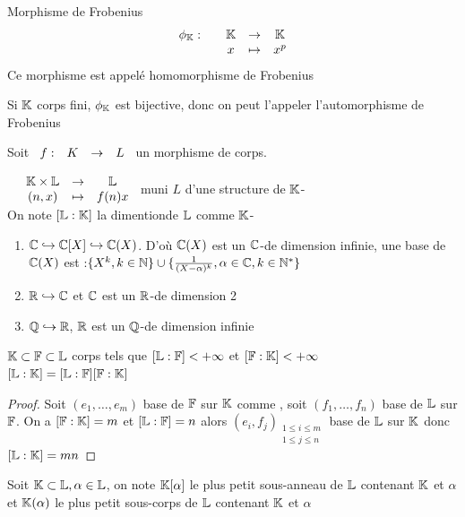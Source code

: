 \documentclass[]{report}
\begin{document}
    \begin{df}{Morphisme de Frobenius}{}
        \[\begin{array}{ccccc} \phi_{\mathbb{K}} : & & \mathbb{K} & \to & \mathbb{K} \\ & & x & \mapsto & x^p \end{array}\]
        Ce morphisme est appelé homomorphisme de Frobenius
    \end{df}

    \begin{re}{}{}
        Si $\mathbb{K}$ corps fini, $\phi_{\mathbb{K}}$ est bijective, donc on peut l'appeler l'automorphisme de Frobenius
    \end{re}

    Soit $\begin{array}{ccccc} f : & K & \to & L \end{array}$ un morphisme de corps.

    \begin{df}{}{}
        $\begin{array}{ccccc} & \mathbb{K}\times \mathbb{L} & \to & \mathbb{L} \\ & (n,x) & \mapsto & f(n)x \end{array}$ muni $L$ d'une structure de $\mathbb{K}$-\ev\\
        On note $[\mathbb{L}:\mathbb{K}]$ la dimentionde $\mathbb{L}$ comme $\mathbb{K}$-\ev
    \end{df}

    \begin{ex}{}{}
        \begin{enumerate}
            \item $\mathbb{C}\hookrightarrow \mathbb{C}[X]\hookrightarrow \mathbb{C}(X)$. D'où $\mathbb{C}(X)$ est un $\mathbb{C}$-\ev de dimension infinie, une base de $\mathbb{C}(X)$ est :$\{X^k,k\in\mathbb{N}\}\cup\{\frac{1}{(X-\alpha)^k},\alpha\in\mathbb{C},k\in\mathbb{N}^*\}$
            \item $\mathbb{R}\hookrightarrow\mathbb{C}$ et $\mathbb{C}$ est un $\mathbb{R}$-\ev de dimension 2
            \item $\mathbb{Q}\hookrightarrow\mathbb{R}$, $\mathbb{R}$ est un $\mathbb{Q}$-\ev de dimension infinie
        \end{enumerate}
    \end{ex}

    \begin{prop}{}{}
        $\mathbb{K}\subset \mathbb{F}\subset \mathbb{L}$ corps tels que $[\mathbb{L}:\mathbb{F}]<+\infty$ et $[\mathbb{F}:\mathbb{K}]<+\infty$\\
        $[\mathbb{L}:\mathbb{K}]=[\mathbb{L}:\mathbb{F}][\mathbb{F}:\mathbb{K}]$
    \end{prop}

    \begin{proof}
        Soit $(e_1,\ldots,e_m)$ base de $\mathbb{F}$ sur $\mathbb{K}$ comme \ev, soit $(f_1,\ldots,f_n)$ base de $\mathbb{L}$ sur $\mathbb{F}$. On a $[\mathbb{F}:\mathbb{K}]=m$ et $[\mathbb{L}:\mathbb{F}]=n$ alors $(e_i,f_j)_{\substack{1\le i\le m\\ 1\le j\le n}}$ base de $\mathbb{L}$ sur $\mathbb{K}$ donc $[\mathbb{L}:\mathbb{K}]=mn$
    \end{proof}

    \begin{df}{}{}
        Soit $\mathbb{K}\subset \mathbb{L},\alpha\in \mathbb{L}$, on note $\mathbb{K}[\alpha]$ le plus petit sous-anneau de $\mathbb{L}$ contenant $\mathbb{K}$ et $\alpha$ et $\mathbb{K}(\alpha)$ le plus petit sous-corps de $\mathbb{L}$ contenant $\mathbb{K}$ et $\alpha$
    \end{df}
\end{document}

